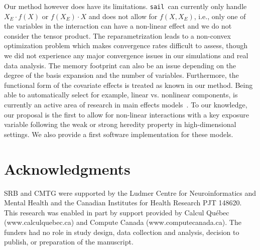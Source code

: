 \documentclass[useAMS,usenatbib,referee]{biom}
\newcommand{\sail}{\texttt{sail}}
\begin{document}
Our method however does have its limitations. \sail ~can currently only handle $X_E \cdot f(X)$ or $f(X_E) \cdot X$ and does not allow for $f(X, X_E)$, i.e., only one of the variables in the interaction can have a non-linear effect and we do not consider the tensor product. 
The reparametrization leads to a non-convex optimization problem which makes convergence rates difficult to assess, though we did not experience any major convergence issues in our simulations and real data analysis. 
The memory footprint can also be an issue depending on the degree of the basis expansion and the number of variables. 
Furthermore, the functional form of the covariate effects is treated as known in our method. 
Being able to automatically select for example, linear vs. nonlinear components, is currently an active area of research in main effects models~\citep{haris2016nonparametric}.
To our knowledge, our proposal is the first to allow for non-linear interactions with a key exposure variable following the weak or strong heredity property in high-dimensional settings. 
We also provide a first software implementation for these models.




\backmatter




\section*{Acknowledgments}

SRB and CMTG were supported by the Ludmer Centre for Neuroinformatics and Mental Health and the Canadian Institutes for Health Research PJT 148620. 
This research was enabled in part by support provided by Calcul Québec (www.calculquebec.ca) and Compute Canada
(www.computecanada.ca). The funders had no role in study design, data collection and analysis, decision to publish, or preparation of the manuscript.

\end{document}
